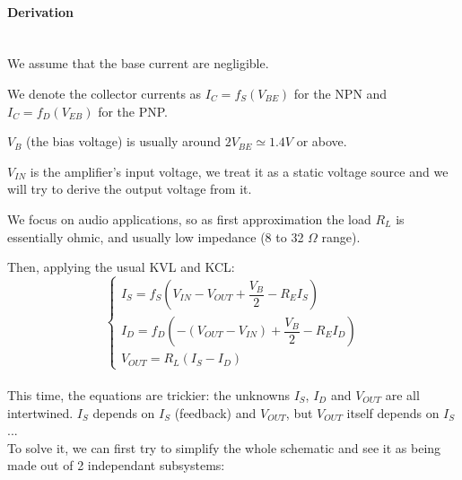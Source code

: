 \documentclass[10pt]{article}
\begin{document}
\paragraph{Derivation}\mbox{}\\
We assume that the base current are negligible. 

We denote the collector currents as $I_C = f_S(V_{BE})$ for the NPN and $I_C = f_D(V_{EB})$ for the PNP. 

$V_B$ (the bias voltage) is usually around $2V_{BE} \simeq 1.4V$ or above. 

$V_{IN}$ is the amplifier's input voltage, we treat it as a static voltage source and we will try to derive the output voltage from it. 

We focus on audio applications, so as  first approximation the load $R_L$ is essentially ohmic, and usually low impedance (8 to 32 $\Omega$ range).

Then, applying the usual KVL and KCL:
$$
\left\{
	\begin{array}{ll}
		I_S = f_S \left(V_{IN} - V_{OUT} + \dfrac{V_B}{2} - R_E I_S \right) \\
		I_D = f_D \left(-(V_{OUT} - V_{IN}) + \dfrac{V_B}{2} - R_E I_D \right) \\
		V_{OUT} = R_L(I_S-I_D)
	\end{array}
\right.
$$\\

This time, the equations are trickier: the unknowns $I_S$, $I_D$ and $V_{OUT}$ are all intertwined.
$I_S$ depends on $I_S$ (feedback) and $V_{OUT}$, but $V_{OUT}$ itself depends on $I_S$...\\

To solve it, we can first try to simplify the whole schematic and see it as being made out of 2 independant subsystems:
\end{document}
